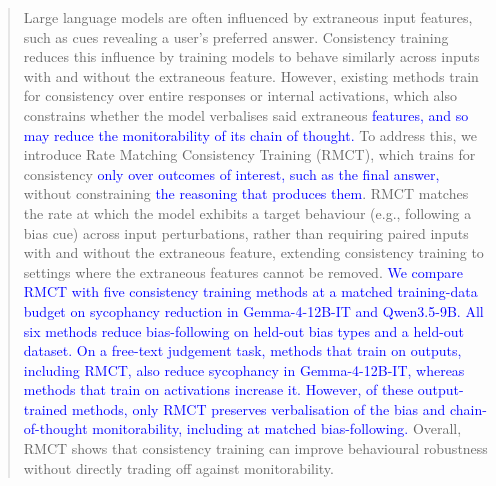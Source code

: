 \documentclass{article}
\begin{document}

\printAffiliationsAndNotice{}

\begin{abstract}
Large language models are often influenced by extraneous input features, such as cues revealing a user’s preferred answer. Consistency training reduces this influence by training models to behave similarly across inputs with and without the extraneous feature. However, existing methods train for consistency over entire responses or internal activations, which also constrains whether the model verbalises said extraneous \textcolor{blue}{features, and so may reduce the monitorability of its chain of thought.} To address this, we introduce Rate Matching Consistency Training (RMCT), which trains for consistency \textcolor{blue}{only over outcomes of interest, such as the final answer,} without constraining \textcolor{blue}{the reasoning that produces them}. RMCT matches the rate at which the model exhibits a target behaviour (e.g., following a bias cue) across input perturbations, rather than requiring paired inputs with and without the extraneous feature, extending consistency training to settings where the extraneous features cannot be removed. \textcolor{blue}{We compare RMCT with five consistency training methods at a matched training-data budget on sycophancy reduction in Gemma-4-12B-IT and Qwen3.5-9B.} \textcolor{blue}{All six methods reduce bias-following on held-out bias types and a held-out dataset.} \textcolor{blue}{On a free-text judgement task, methods that train on outputs, including RMCT, also reduce sycophancy in Gemma-4-12B-IT, whereas methods that train on activations increase it.} \textcolor{blue}{However, of these output-trained methods, only RMCT preserves verbalisation of the bias and chain-of-thought monitorability, including at matched bias-following.} Overall, RMCT shows that consistency training can improve behavioural robustness without directly trading off against monitorability.
\end{abstract}
\end{document}
